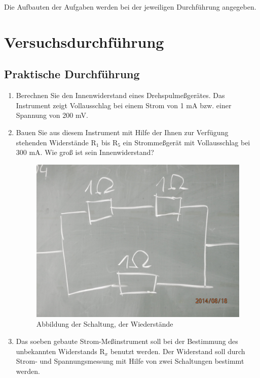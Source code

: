 \documentclass[12pt]{scrartcl}
\begin{document}
Die Aufbauten der Aufgaben werden bei der jeweiligen Durchführung angegeben.

\section{Versuchsdurchführung}


\subsection{Praktische Durchführung}

\begin{enumerate}

	\item 
	Berechnen Sie den Innenwiderstand 				eines Drehspulmeßgerätes. Das Instrument
	zeigt Vollausschlag bei einem Strom von 			1 mA bzw. einer Spannung von 200 mV.
	\item
	Bauen Sie aus diesem Instrument mit 				Hilfe der Ihnen zur Verfügung stehenden 			Widerstände $\text{R}_1$ bis 					$\text{R}_5$ ein 								Strommeßgerät mit Vollausschlag bei 300 			mA. Wie groß ist sein Innenwiderstand?
	\newpage
	\begin{figure}[htbp] 
	  \centering
	    \includegraphics[scale = 0.1]{tafel_1.JPG}
	  	\caption[Abbildung der Schaltung, der Wiederstände parallel zum Drehspulinstrument]{Abbildung der Schaltung, der Wiederstände}
	  \label{fig:tafel_1}
	\end{figure}
		
	
	\item
	Das soeben gebaute Strom-Meßinstrument 			soll bei der Bestimmung des unbekannten 			Widerstands $\text{R}_x$ benutzt werden. 	Der Widerstand soll durch Strom- und 			Spannungsmessung mit Hilfe von zwei 				Schaltungen bestimmt werden.
	

\end{enumerate}
\end{document}
